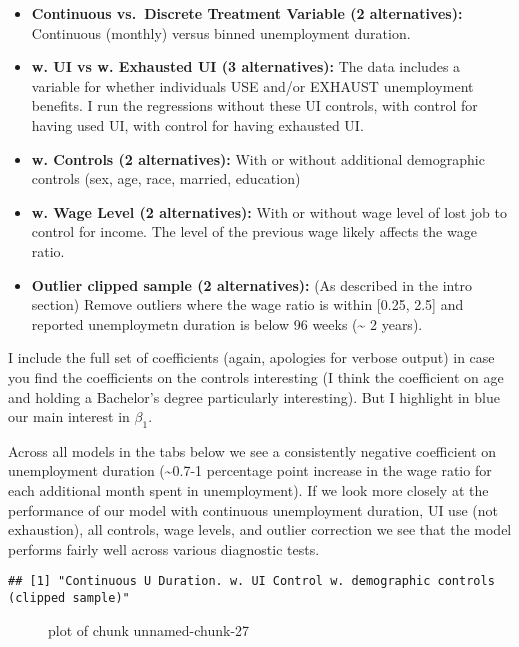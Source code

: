 \begin{itemize}
\item
  \textbf{Continuous vs.~Discrete Treatment Variable (2 alternatives):}
  Continuous (monthly) versus binned unemployment duration.
\item
  \textbf{w. UI vs w. Exhausted UI (3 alternatives):} The data includes
  a variable for whether individuals USE and/or EXHAUST unemployment
  benefits. I run the regressions without these UI controls, with
  control for having used UI, with control for having exhausted UI.
\item
  \textbf{w. Controls (2 alternatives):} With or without additional
  demographic controls (sex, age, race, married, education)
\item
  \textbf{w. Wage Level (2 alternatives):} With or without wage level of
  lost job to control for income. The level of the previous wage likely
  affects the wage ratio.
\item
  \textbf{Outlier clipped sample (2 alternatives):} (As described in the
  intro section) Remove outliers where the wage ratio is within {[}0.25,
  2.5{]} and reported unemploymetn duration is below 96 weeks
  (\textasciitilde{} 2 years).
\end{itemize}

I include the full set of coefficients (again, apologies for verbose
output) in case you find the coefficients on the controls interesting (I
think the coefficient on age and holding a Bachelor's degree
particularly interesting). But I highlight in blue our main interest in
\(\beta_{1}\).

Across all models in the tabs below we see a consistently negative
coefficient on unemployment duration (\textasciitilde0.7-1 percentage
point increase in the wage ratio for each additional month spent in
unemployment). If we look more closely at the performance of our model
with continuous unemployment duration, UI use (not exhaustion), all
controls, wage levels, and outlier correction we see that the model
performs fairly well across various diagnostic tests.

\begin{verbatim}
## [1] "Continuous U Duration. w. UI Control w. demographic controls (clipped sample)"
\end{verbatim}

\begin{figure}
\centering
{}
\caption{plot of chunk unnamed-chunk-27}
\end{figure}

